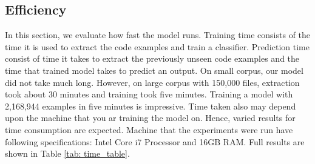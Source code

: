 \documentclass[sigconf]{acmart}
\begin{document}

\subsection{Efficiency}
In this section, we evaluate how fast the model runs. Training time consists of the time it is used to extract the code examples and train a classifier. Prediction time consist of time it takes to extract the previously unseen code examples and the time that trained model takes to predict an output. On small corpus, our model did not take much long. However, on large corpus with 150,000 files, extraction took about 30 minutes and training took five minutes. Training a model with 2,168,944 examples in five minutes is impressive. Time taken also may depend upon the machine that you ar training the model on. Hence, varied results for time consumption are expected. Machine that the experiments were run have following specifications: Intel Core i7 Processor and 16GB RAM. Full results are shown in Table \ref{tab: time_table}. 
\end{document}
